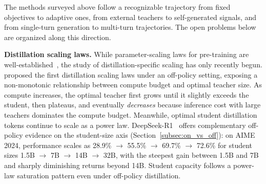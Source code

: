 \documentclass{article} %
\begin{document}
The methods surveyed above follow a recognizable trajectory from fixed objectives to adaptive ones, from external teachers to self-generated signals, and from single-turn generation to multi-turn trajectories. The open problems below are organized along this direction.

\textbf{Distillation scaling laws.} While parameter-scaling laws for pre-training are well-established~\citep{2001.08361,2203.15556}, the study of distillation-specific scaling has only recently begun. \citet{2502.08606} proposed the first distillation scaling laws under an off-policy setting, exposing a non-monotonic relationship between compute budget and optimal teacher size. As compute increases, the optimal teacher first grows until it slightly exceeds the student, then plateaus, and eventually \emph{decreases} because inference cost with large teachers dominates the compute budget. Meanwhile, optimal student distillation tokens continue to scale as a power law. DeepSeek-R1~\citep{2501.12948} offers complementary off-policy evidence on the student-size axis (Section~\ref{subsec:on_vs_off}): on AIME 2024, performance scales as 28.9\% $\to$ 55.5\% $\to$ 69.7\% $\to$ 72.6\% for student sizes 1.5B $\to$ 7B $\to$ 14B $\to$ 32B, with the steepest gain between 1.5B and 7B and sharply diminishing returns beyond 14B. Student capacity follows a power-law saturation pattern even under off-policy distillation.
\end{document}
